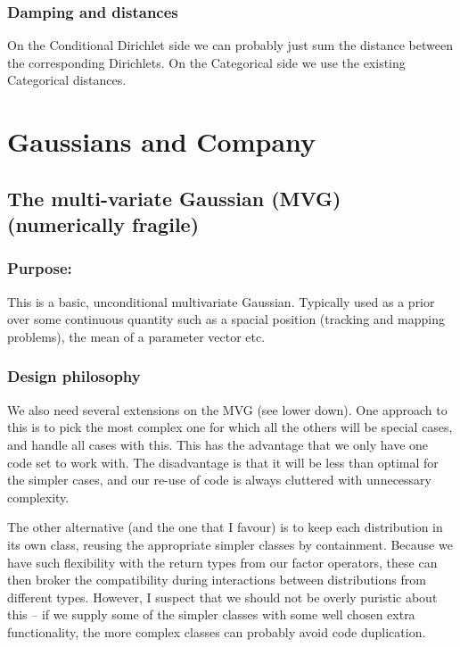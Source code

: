 \documentclass[oneside,english]{scrbook}
\begin{document}
\section{Damping and distances}
On the Conditional Dirichlet side we can probably just sum the
distance between the corresponding Dirichlets. On the Categorical side
we use the existing Categorical distances.

\part{Gaussians and Company}



\chapter{The multi-variate Gaussian (MVG) (numerically fragile)}

\section{Purpose:}
This is a basic, unconditional multivariate Gaussian. Typically used
as a prior over some continuous quantity such as a spacial position
(tracking and mapping problems), the mean of a parameter vector etc.

\section{Design philosophy}
We also need several extensions on the MVG (see lower down). One
approach to this is to pick the most complex one for which all the
others will be special cases, and handle all cases with this. This has
the advantage that we only have one code set to work with. The
disadvantage is that it will be less than optimal for the simpler
cases, and our re-use of code is always cluttered with unnecessary
complexity.

The other alternative (and the one that I favour) is to keep each
distribution in its own class, reusing the appropriate simpler classes
by containment. Because we have such flexibility with the return types
from our factor operators, these can then broker the compatibility
during interactions between distributions from different
types. However, I suspect that we should not be overly puristic about
this -- if we supply some of the simpler classes with some well chosen
extra functionality, the more complex classes can probably avoid code
duplication.
\end{document}
